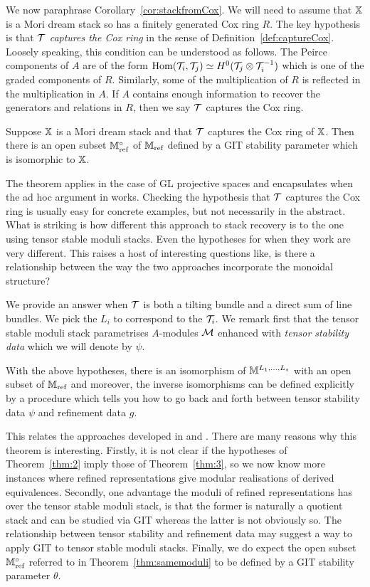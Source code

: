 \documentclass[12pt]{amsart}
\begin{document}
We now paraphrase Corollary~\ref{cor:stackfromCox}. We will need to assume that $\mathbb{X}$ is a Mori dream stack so has a finitely generated Cox ring $R$. The key hypothesis is that $\mathcal{T}$ {\em captures the Cox ring} in the sense of Definition~\ref{def:captureCox}. Loosely speaking, this condition can be understood as follows. The Peirce components of $A$ are of the form $\operatorname{Hom}(\mathcal{T}_i,\mathcal{T}_j) \simeq H^0(\mathcal{T}_j \otimes \mathcal{T}_i^{-1})$ which is one of the graded components of $R$. Similarly, some of the multiplication of $R$ is reflected in the multiplication in $A$. If $A$ contains enough information to recover the generators and relations in $R$, then we say $\mathcal{T}$ captures the Cox ring. 
\begin{theorem}  \label{thm:3}
Suppose $\mathbb{X}$ is a Mori dream stack and that $\mathcal{T}$ captures the Cox ring of $\mathbb{X}$. 
Then there is an open subset $\mathbb{M}_{\textup{ref}}^\circ$ of $\mathbb{M}_{\textup{ref}}$ defined by a GIT stability parameter which is isomorphic to $\mathbb{X}$.
\end{theorem}
The theorem applies in the case of GL projective spaces and encapsulates when the ad hoc argument in \cite{AU} works. Checking the hypothesis that $\mathcal{T}$ captures the Cox ring is usually easy for concrete examples, but not necessarily in the abstract. What is striking is how different this approach to stack recovery is to the one using tensor stable moduli stacks. Even the hypotheses for when they work are very different. This raises a host of interesting questions like, is there a relationship between the way the two approaches incorporate the monoidal structure?

We provide an answer when $\mathcal{T}$ is both a tilting bundle and a direct sum of line bundles. We pick the $L_i$ to correspond to the $\mathcal{T}_i$. We remark first that the tensor stable moduli stack parametrises $A$-modules $\mathcal{M}$ enhanced with {\em tensor stability data} which we will denote by $\psi$.
\begin{theorem}  \label{thm:samemoduli}
With the above hypotheses, there is an isomorphism of $\mathbb{M}^{L_1,\ldots,L_s}$ with an open subset of $\mathbb{M}_{\textup{ref}}$ and moreover, the inverse isomorphisms can be defined explicitly by a procedure which tells you how to go back and forth between tensor stability data $\psi$ and refinement data $g$.
\end{theorem}
This relates the approaches developed in \cite{AU} and \cite{CL}. There are many reasons why this theorem is interesting. Firstly, it is not clear if the hypotheses of Theorem~\ref{thm:2} imply those of Theorem~\ref{thm:3}, so we now know more instances where refined representations give modular realisations of derived equivalences. Secondly, one advantage the moduli of refined representations has over the tensor stable moduli stack, is that the former is naturally a quotient stack and can be studied via GIT whereas the latter is not obviously so. The relationship between tensor stability and refinement data may suggest a way to apply GIT to tensor stable moduli stacks. Finally, we do expect the open subset $\mathbb{M}_\text{ref}^\circ$ referred to in Theorem~\ref{thm:samemoduli} to be defined by a GIT stability parameter $\theta$.
\end{document}
